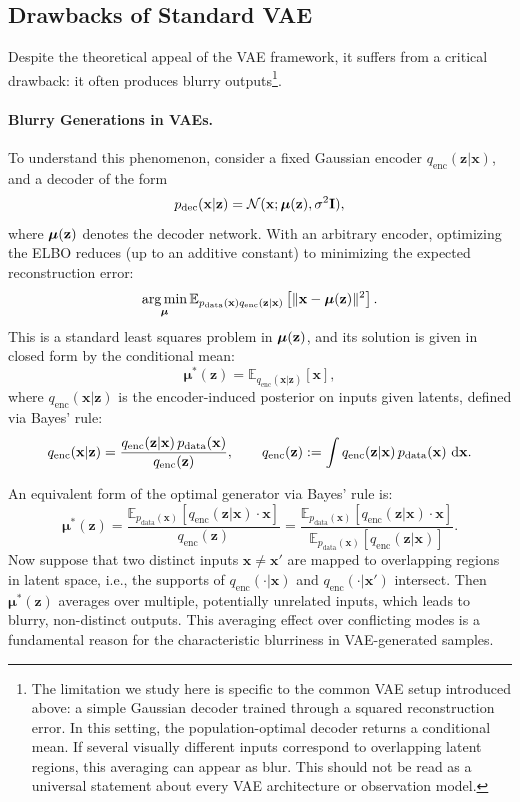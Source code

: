 \subsection{Drawbacks of Standard VAE}\label{sec:drawback_standard_VAE}
Despite the theoretical appeal of the VAE framework, it suffers from a critical drawback: it often produces blurry outputs\footnote{The limitation we study here is specific to the common VAE setup introduced
above: a simple Gaussian decoder trained through a squared reconstruction
error. In this setting, the population-optimal decoder returns a conditional
mean. If several visually different inputs correspond to overlapping latent
regions, this averaging can appear as blur. This should not be read as a
universal statement about every VAE architecture or observation model.}.

\paragraph{Blurry Generations in VAEs.}
To understand this phenomenon, consider a fixed Gaussian encoder $ q_{\text{enc}}(\mathbf{z}|\mathbf{x}) $, and a decoder of the form
\[
p_{\text{dec}}(\mathbf{x}|\mathbf{z}) = \mathcal{N}(\mathbf{x}; \bm{\mu}({\mathbf{z}}), \sigma^2 {\mathbf{I}}),
\]
where $ \bm{\mu}({\mathbf{z}}) $ denotes the decoder network. With an arbitrary encoder, optimizing the ELBO reduces (up to an additive constant) to minimizing the expected reconstruction error:
\[
\operatorname*{arg\,min}_{\bm{\mu}} \mathbb{E}_{p_{\text{data}}(\mathbf{x})q_{\text{enc}}(\mathbf{z}|\mathbf{x})} \left[ \| \mathbf{x} - \bm{\mu}({\mathbf{z}}) \|^2 \right].
\]
This is a standard least squares problem in $ \bm{\mu}({\mathbf{z}}) $, and its solution is given in closed form by the conditional mean:
\[
\bm{\mu}^*(\mathbf{z}) = \mathbb{E}_{q_{\text{enc}}(\mathbf{x}|\mathbf{z})}[\mathbf{x}],
\]
where $ q_{\text{enc}}(\mathbf{x}|\mathbf{z}) $ is the encoder-induced posterior on inputs given latents, defined via Bayes’ rule:
\[
q_{\text{enc}}(\mathbf{x}|\mathbf{z})
=
\frac{q_{\text{enc}}(\mathbf{z}|\mathbf{x})\, p_{\text{data}}(\mathbf{x})}{q_{\text{enc}}(\mathbf{z})},
\qquad
q_{\text{enc}}(\mathbf{z})
:=
\int q_{\text{enc}}(\mathbf{z}|\mathbf{x})\, p_{\text{data}}(\mathbf{x})\, \mathop{}\!\mathrm{d} \mathbf{x}.
\]

An equivalent form of the optimal generator via Bayes' rule is:
\[
\bm{\mu}^*(\mathbf{z})
=
\frac{\mathbb{E}_{p_{\text{data}}(\mathbf{x})}\!\left[q_{\text{enc}}(\mathbf{z}|\mathbf{x}) \cdot \mathbf{x}\right]}
{q_{\text{enc}}(\mathbf{z})}
=
\frac{\mathbb{E}_{p_{\text{data}}(\mathbf{x})}\!\left[q_{\text{enc}}(\mathbf{z}|\mathbf{x}) \cdot \mathbf{x}\right]}
{\mathbb{E}_{p_{\text{data}}(\mathbf{x})}\!\left[q_{\text{enc}}(\mathbf{z}|\mathbf{x})\right]}.
\]
Now suppose that two distinct inputs $ \mathbf{x} \neq \mathbf{x}' $ are mapped to overlapping regions in latent space, i.e., the supports of $ q_{\text{enc}}(\cdot|\mathbf{x}) $ and $ q_{\text{enc}}(\cdot|\mathbf{x}') $ intersect. Then $\bm{\mu}^*(\mathbf{z})$ averages over multiple, potentially unrelated inputs, which leads to blurry, non-distinct outputs. This averaging effect over conflicting modes is a fundamental reason for the characteristic blurriness in VAE-generated samples.




